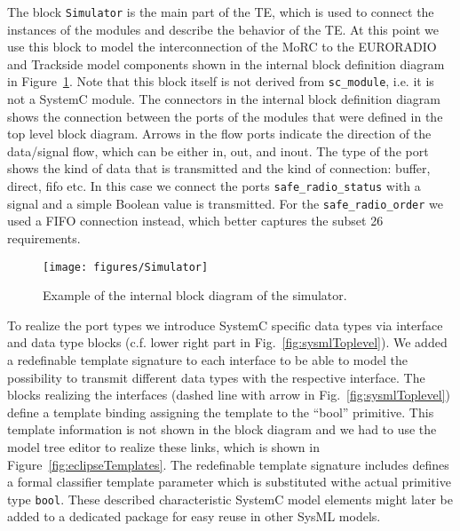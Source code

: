\documentclass{template/openetcs_article}
\begin{document}
The block \verb|Simulator| is the main part of the TE, which is used to connect the instances of the modules and describe the behavior of the TE. At this point we use this block to model the interconnection of the MoRC to the EURORADIO and Trackside model components shown in the internal block definition diagram in Figure~\ref{fig:simulatorIbd}. Note that this block itself is not derived from \verb|sc_module|, i.e. it is not a SystemC module. The connectors in the internal block definition diagram shows the connection between the ports of the modules that were defined in the top level block diagram. Arrows in the flow ports indicate the direction of the data/signal flow, which can be either in, out, and inout. The type of the port shows the kind of data that is transmitted and the kind of connection: buffer, direct, fifo etc. In this case we connect the ports \verb|safe_radio_status| with a signal and a simple Boolean value is transmitted. For the \verb|safe_radio_order| we used a FIFO connection instead, which better captures the subset 26 requirements.

\begin{figure}
\begin{center}
\texttt{[image: figures/Simulator]}
\end{center}
\caption{Example of the internal block diagram of the simulator.}
\label{fig:simulatorIbd}
\end{figure}

To realize the port types we introduce SystemC specific data types via interface and data type blocks (c.f. lower right part in Fig.~\ref{fig:sysmlToplevel}). We added a redefinable template signature to each interface to be able to model the possibility to transmit different data types with the respective interface. The blocks realizing the interfaces (dashed line with arrow in Fig.~\ref{fig:sysmlToplevel}) define a template binding assigning the template to the "`bool"' primitive. This template information is not shown in the block diagram and we had to use the model tree editor to realize these links, which is shown in Figure~\ref{fig:eclipseTemplates}. The redefinable template signature includes defines a formal classifier template parameter which is substituted withe actual primitive type \verb|bool|. These described characteristic SystemC model elements might later be added to a dedicated package for easy reuse in other SysML models.

\end{document}
